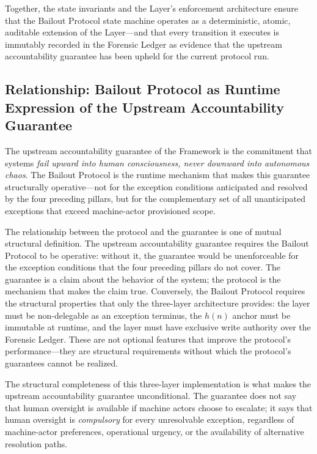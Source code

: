 Together, the state invariants and the \fact{} Layer's enforcement architecture
ensure that the Bailout Protocol state machine operates as a deterministic,
atomic, auditable extension of the \fact{} Layer---and that every transition it
executes is immutably recorded in the Forensic Ledger as evidence that the
upstream accountability guarantee has been upheld for the current protocol run.

\subsection{Relationship: Bailout Protocol as Runtime Expression of the
Upstream Accountability Guarantee}\label{sec:runtime-expression}

The upstream accountability guarantee of the \bxthree{} Framework is the
commitment that \bxthree{} systems \emph{fail upward into human consciousness,
never downward into autonomous chaos}.  The Bailout Protocol is the runtime
mechanism that makes this guarantee structurally operative---not for the
exception conditions anticipated and resolved by the four preceding pillars, but
for the complementary set of all unanticipated exceptions that exceed
machine-actor provisioned scope.

The relationship between the protocol and the guarantee is one of mutual
structural definition.  The upstream accountability guarantee requires the Bailout
Protocol to be operative: without it, the guarantee would be unenforceable for
the exception conditions that the four preceding pillars do not cover.  The
guarantee is a claim about the behavior of the system; the protocol is the
mechanism that makes the claim true.  Conversely, the Bailout Protocol requires
the structural properties that only the \bxthree{} three-layer architecture
provides: the \purpose{} layer must be non-delegable as an exception terminus,
the $h(n)$ anchor must be immutable at runtime, and the \fact{} layer must have
exclusive write authority over the Forensic Ledger.  These are not optional
features that improve the protocol's performance---they are structural
requirements without which the protocol's guarantees cannot be realized.

The structural completeness of this three-layer implementation is what makes the
upstream accountability guarantee unconditional.  The guarantee does not say that
human oversight is available if machine actors choose to escalate; it says that
human oversight is \emph{compulsory} for every unresolvable exception, regardless
of machine-actor preferences, operational urgency, or the availability of
alternative resolution paths.

